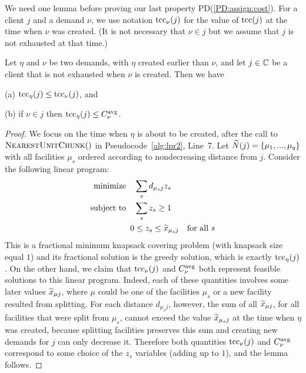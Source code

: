 \documentclass[11pt]{article}
\begin{document}

We need one lemma before proving our last property
PD(\ref{PD:assign:cost}).  For a client $j$ and a demand
$\nu$, we use notation $\textrm{tcc}_{\nu}(j)$ for the value of
$\textrm{tcc}(j)$ at the time when $\nu$ was created. (It is not
necessary that $\nu\in j$ but we assume that $j$ is not
exhausted at that time.)


\begin{lemma}\label{lem: tcc optimal}
  Let $\eta$ and $\nu$ be two demands, with $\eta$ created
  earlier than $\nu$, and let $j\in\mathbb{C}$ be a client
  that is not exhausted when $\nu$ is created. Then we have
\begin{description}
	\item{(a)} $\textrm{tcc}_\eta(j) \le \textrm{tcc}_{\nu}(j)$, and 
	\item{(b)} if $\nu\in j$ then $\textrm{tcc}_\eta(j) \le C^{{\mbox{\scriptsize\rm avg}}}_{\nu}$.
\end{description}
\end{lemma}

\begin{proof}
  We focus on the time when $\eta$ is about to be created,
  after the call to ${\textsc{NearestUnitChunk}}()$ in
  Pseudocode~\ref{alg:lpr2}, Line~7.  Let ${\widetilde N}(j) =
  \{\mu_1,...,\mu_q\}$ with all facilities $\mu_s$ ordered
  according to nondecreasing distance from $j$.  Consider
  the following linear program:
%
\begin{alignat*}{1}
	\textrm{minimize} \quad & \sum_s d_{\mu_s j}z_s
			\\
	\textrm{subject to} \quad & \sum_s z_s  \ge 1
			\\
 	0 &\le z_s \le {\widetilde x}_{\mu_s j} \quad \textrm{for all}\ s
\end{alignat*}
%
  This is a fractional
  minimum knapsack covering problem (with knapsack size equal $1$) and its fractional
  solution is the greedy solution, which is exactly
  $\textrm{tcc}_\eta(j)$.  On the other hand, we claim that
  $\textrm{tcc}_\nu(j)$ and $C^{{\mbox{\scriptsize\rm avg}}}_{\nu}$ both represent feasible
  solutions to this linear program. Indeed, each of these
  quantities involves some later values ${\widetilde x}_{\mu j}$,
  where $\mu$ could be one of the facilities $\mu_s$ or a
  new facility resulted from splitting. For each distance
  $d_{\mu_s j}$, however, the sum of all ${\widetilde x}_{\mu j}$,
  for all facilities that were split from $\mu_s$, cannot exceed
 the value ${\widetilde x}_{\mu_s j}$ at the time when
  $\eta$ was created, because splitting facilities preserves this sum and
 creating new demands for $j$ can only decrease it.
Therefore both quantities
  $\textrm{tcc}_\nu(j)$ and $C^{{\mbox{\scriptsize\rm avg}}}_{\nu}$ correspond to some
  choice of the $z_s$ variables (adding up to $1$), and the
  lemma follows.
\end{proof}
\end{document}
